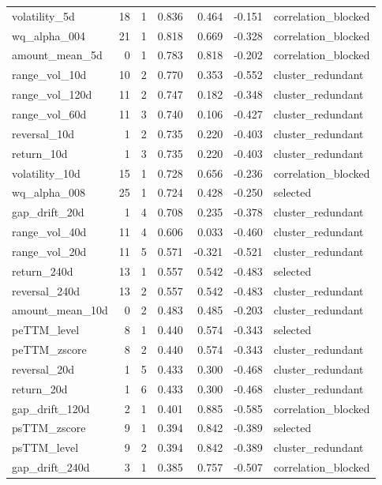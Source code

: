 \begin{longtable}{lrrrrrl}
volatility\_5d & 18 & 1 & 0.836 & 0.464 & -0.151 & correlation\_blocked \\
wq\_alpha\_004 & 21 & 1 & 0.818 & 0.669 & -0.328 & correlation\_blocked \\
amount\_mean\_5d & 0 & 1 & 0.783 & 0.818 & -0.202 & correlation\_blocked \\
range\_vol\_10d & 10 & 2 & 0.770 & 0.353 & -0.552 & cluster\_redundant \\
range\_vol\_120d & 11 & 2 & 0.747 & 0.182 & -0.348 & cluster\_redundant \\
range\_vol\_60d & 11 & 3 & 0.740 & 0.106 & -0.427 & cluster\_redundant \\
reversal\_10d & 1 & 2 & 0.735 & 0.220 & -0.403 & cluster\_redundant \\
return\_10d & 1 & 3 & 0.735 & 0.220 & -0.403 & cluster\_redundant \\
volatility\_10d & 15 & 1 & 0.728 & 0.656 & -0.236 & correlation\_blocked \\
wq\_alpha\_008 & 25 & 1 & 0.724 & 0.428 & -0.250 & selected \\
gap\_drift\_20d & 1 & 4 & 0.708 & 0.235 & -0.378 & cluster\_redundant \\
range\_vol\_40d & 11 & 4 & 0.606 & 0.033 & -0.460 & cluster\_redundant \\
range\_vol\_20d & 11 & 5 & 0.571 & -0.321 & -0.521 & cluster\_redundant \\
return\_240d & 13 & 1 & 0.557 & 0.542 & -0.483 & selected \\
reversal\_240d & 13 & 2 & 0.557 & 0.542 & -0.483 & cluster\_redundant \\
amount\_mean\_10d & 0 & 2 & 0.483 & 0.485 & -0.203 & cluster\_redundant \\
peTTM\_level & 8 & 1 & 0.440 & 0.574 & -0.343 & selected \\
peTTM\_zscore & 8 & 2 & 0.440 & 0.574 & -0.343 & cluster\_redundant \\
reversal\_20d & 1 & 5 & 0.433 & 0.300 & -0.468 & cluster\_redundant \\
return\_20d & 1 & 6 & 0.433 & 0.300 & -0.468 & cluster\_redundant \\
gap\_drift\_120d & 2 & 1 & 0.401 & 0.885 & -0.585 & correlation\_blocked \\
psTTM\_zscore & 9 & 1 & 0.394 & 0.842 & -0.389 & selected \\
psTTM\_level & 9 & 2 & 0.394 & 0.842 & -0.389 & cluster\_redundant \\
gap\_drift\_240d & 3 & 1 & 0.385 & 0.757 & -0.507 & correlation\_blocked \\

\end{longtable}
